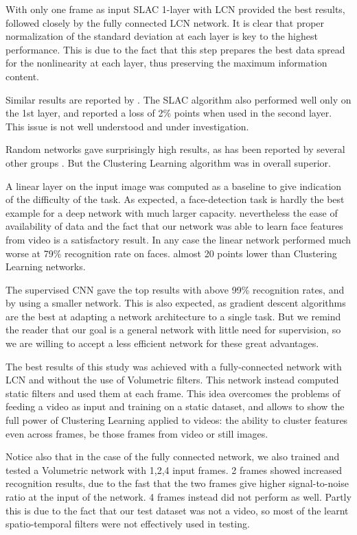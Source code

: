 \documentclass{article} %
\begin{document}
With only one frame as input SLAC 1-layer with LCN provided the best results, followed closely by the fully connected LCN network. It is clear that proper normalization of the standard deviation at each layer is key to the highest performance. This is due to the fact that this step prepares the best data spread for the nonlinearity at each layer, thus preserving the maximum information content. 

Similar results are reported by \cite{coates2012emergence}. 
The SLAC algorithm also performed well only on the 1st layer, and reported a loss of 2\% points when used in the second layer. This issue is not well understood and under investigation. 

Random networks gave surprisingly high results, as has been reported by several other groups \cite{saxe2011random}. But the Clustering Learning algorithm was in overall superior. 

A linear layer on the input image was computed as a baseline to give indication of the difficulty of the task. As expected, a face-detection task is hardly the best example for a deep network with much larger capacity. nevertheless the ease of availability of data and the fact that our network was able to learn face features from video is a satisfactory result. In any case the linear network performed much worse at 79\% recognition rate on faces. almost 20 points lower than Clustering Learning networks.

The supervised CNN gave the top results with above 99\% recognition rates, and by using a smaller network. This is also expected, as gradient descent algorithms are the best at adapting a network architecture to a single task. But we remind the reader that our goal is a general network with little need for supervision, so we are willing to accept a less efficient network for these great advantages. 

The best results of this study was achieved with a fully-connected network with LCN and without the use of Volumetric filters. This network instead computed static filters and used them at each frame. This idea overcomes the problems of feeding a video as input and training on a static dataset, and allows to show the full power of Clustering Learning applied to videos: the ability to cluster features even across frames, be those frames from video or still images.

Notice also that in the case of the fully connected network, we also trained and tested a Volumetric network with 1,2,4 input frames. 
2 frames showed increased recognition results, due to the fast that the two frames give higher signal-to-noise ratio at the input of the network. 4 frames instead did not perform as well. Partly this is due to the fact that our test dataset was not a video, so most of the learnt spatio-temporal filters were not effectively used in testing.
\end{document}
